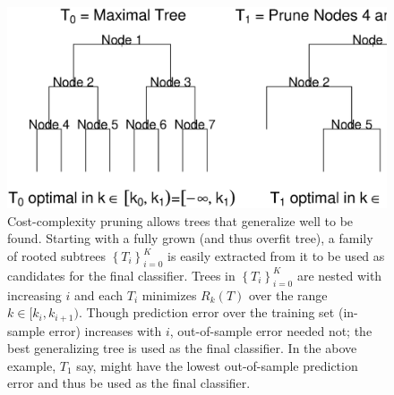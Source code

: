 \begin{figure}
\centering
\includegraphics[width=1\textwidth]{fig_tree_pruning.ps}
\caption{Cost-complexity pruning allows trees that generalize well to be found. Starting with a fully grown (and thus overfit tree), a family of rooted subtrees $\left\{T_i\right\}_{i=0}^K$ is easily extracted from it to be used as candidates for the final classifier. Trees in $\left\{T_i\right\}_{i=0}^K$ are nested with increasing $i$ and each $T_i$ minimizes $R_k(T)$ over the range $k\in[k_i,k_{i+1})$. Though prediction error over the training set (in-sample error) increases with $i$, out-of-sample error needed not; the best generalizing tree is used as the final classifier. In the above example, $T_1$ say, might have the lowest out-of-sample prediction error and thus be used as the final classifier.}
\label{fig_tree_pruning}
\end{figure}

